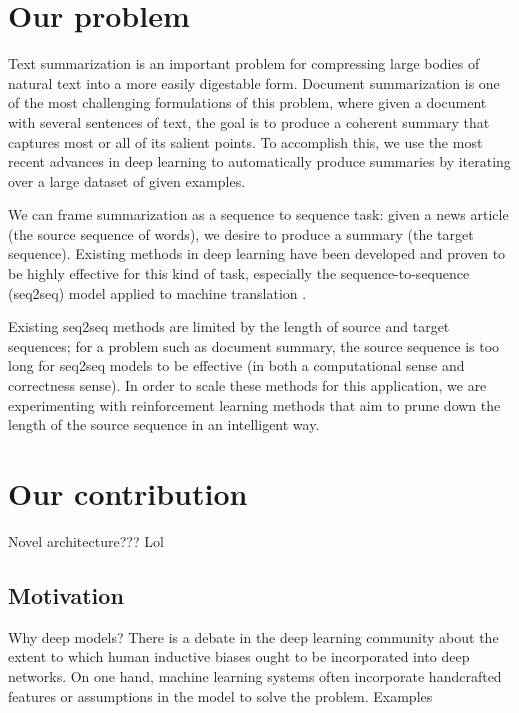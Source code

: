 \documentclass[11pt]{report}
\begin{document}



\section{Our problem}

Text summarization is an important problem for compressing large bodies of natural text into a more easily digestable form. Document summarization is one of the most challenging formulations of this problem, where given a document with several sentences of text, the goal is to produce a coherent summary that captures most or all of its salient points. To accomplish this, we use the most recent advances in deep learning to automatically produce summaries by iterating over a large dataset of given examples.

We can frame summarization as a sequence to sequence task: given a news article (the source sequence of words), we desire to produce a summary (the target sequence). Existing methods in deep learning have been developed and proven to be highly effective for this kind of task, especially the sequence-to-sequence (seq2seq) model applied to machine translation \citep{sutskever2014sequence, bahdanau2014neural}.

Existing seq2seq methods are limited by the length of source and target sequences; for a problem such as document summary, the source sequence is too long for seq2seq models to be effective (in both a computational sense and correctness sense). In order to scale these methods for this application, we are experimenting with reinforcement learning methods that aim to prune down the length of the source sequence in an intelligent way.

\section{Our contribution}

Novel architecture??? Lol


\subsection{Motivation}


Why deep models? There is a debate in the deep learning community about the extent to which human inductive biases ought to be incorporated into deep networks. On one hand, machine learning systems often incorporate handcrafted features or assumptions in the model to solve the problem. Examples %
\end{document}

